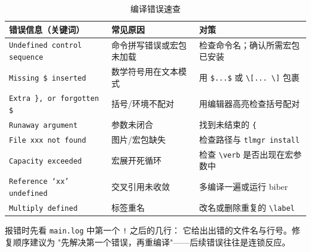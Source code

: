 \begin{table}[htbp]
  \centering
  \caption{编译错误速查}\label{tab:errors}
  \begin{tabular}{lp{4.2cm}p{6cm}}
    \toprule
    错误信息（关键词） & 常见原因 & 对策 \\
    \midrule
    \texttt{Undefined control sequence} & 命令拼写错误或宏包未加载 &
      检查命令名；确认所需宏包已安装 \\
    \texttt{Missing \$ inserted} & 数学符号用在文本模式 &
      用 \texttt{\$...\$} 或 \texttt{\textbackslash[...
      \textbackslash]} 包裹 \\
    \texttt{Extra \}, or forgotten \$} & 括号/环境不配对 &
      用编辑器高亮检查括号配对 \\
    \texttt{Runaway argument} & 参数未闭合 &
      找到未结束的 \texttt{\{} \\
    \texttt{File xxx not found} & 图片/宏包缺失 &
      检查路径与 \texttt{tlmgr install} \\
    \texttt{Capacity exceeded} & 宏展开死循环 &
      检查 \texttt{\textbackslash verb} 是否出现在宏参数中 \\
    \texttt{Reference `xx' undefined} & 交叉引用未收敛 &
      多编译一遍或运行 biber \\
    \texttt{Multiply defined} & 标签重名 &
      改名或删除重复的 \texttt{\textbackslash label} \\
    \bottomrule
  \end{tabular}
\end{table}

\begin{remark}
报错时先看 \texttt{main.log} 中第一个 \texttt{!} 之后的几行：
它给出出错的文件名与行号。修复顺序建议为
"先解决第一个错误，再重编译"——后续错误往往是连锁反应。
\end{remark}

